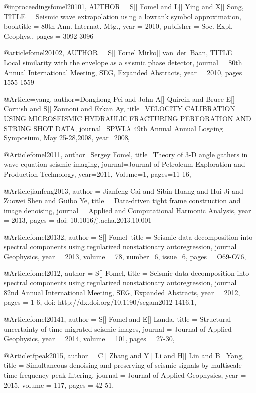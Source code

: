 @inproceedings{fomel20101,
  AUTHOR = {S[] Fomel and L[] Ying and X[] Song},
  TITLE = {Seismic wave extrapolation using a lowrank symbol approximation},
  booktitle =    {80th Ann. Internat. Mtg.},
  year = 	 {2010},
  publisher =    {Soc. Expl. Geophys.},
  pages = {3092-3096}
}

@article{fomel20102,
  AUTHOR = {S[] Fomel Mirko[] van~der~Baan},
  TITLE = {Local similarity with the envelope as a seismic phase detector},
  journal =    {80th Annual International Meeting, SEG, Expanded Abstracts},
  year = 	 {2010},
  pages = {1555-1559}
}

@Article={yang,
  author={Donghong Pei and John A[] Quirein and Bruce E[] Cornish and S[] Zannoni and Erkan Ay},
  title={VELOCITY CALIBRATION USING MICROSEISMIC HYDRAULIC FRACTURING PERFORATION AND STRING SHOT DATA},
  journal={SPWLA 49th Annual Annual Logging Symposium, May 25-28,2008},
  year=2008,
}


@Article{fomel2011,
  author={Sergey Fomel},
  title={Theory of 3-D angle gathers in wave-equation seismic imaging},
  journal={Journal of Petroleum Exploration and Production Technology},
  year=2011,
  Volume=1,
  pages={11-16},
}


@Article{jianfeng2013,
  author = 	 {Jianfeng Cai and Sibin Huang and Hui Ji and Zuowei Shen and Guibo Ye},
  title = 	 {Data-driven tight frame construction and image denoising},
  journal = 	 {Applied and Computational Harmonic Analysis},
  year = 	 2013,
  pages = 	 {doi: 10.1016/j.acha.2013.10.001}}

@Article{fomel20132,
  author = 	 {S[] Fomel},
  title = 	 {Seismic data decomposition into spectral components using regularized nonstationary autoregression},
  journal = 	 {Geophysics},
  year = 	 2013,
  volume =	 78,
  number=6,
  issue=6,
  pages =	 {O69-O76},
}

@Article{fomel2012,
  author = 	 {S[] Fomel},
  title = 	 {Seismic data decomposition into spectral components using regularized nonstationary autoregression},
  journal = 	 {82nd Annual International Meeting, SEG, Expanded Abstracts},
  year = 	 2012,
  pages =	 {1-6, doi: http://dx.doi.org/10.1190/segam2012-1416.1},
}


@Article{fomel20141,
  author = 	 {S[] Fomel and E[] Landa},
  title = 	 {Structural uncertainty of time-migrated seismic images},
  journal = 	 {Journal of Applied Geophysics},
  year = 	 2014,
  volume =	 101,
  pages =	 {27-30},
}

@Article{tfpeak2015,
  author = 	 {C[] Zhang and Y[] Li and H[] Lin and B[] Yang},
  title = 	 {Simultaneous denoising and preserving of seismic signals by multiscale time-frequency peak filtering},
  journal = 	 {Journal of Applied Geophysics},
  year = 	 2015,
  volume =	 117,
  pages =	 {42-51},
}


